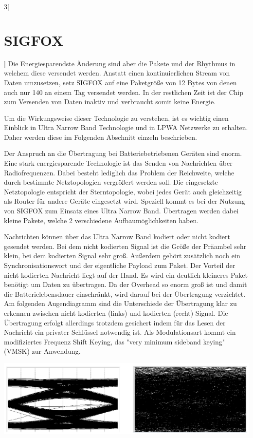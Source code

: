\begin{multicols}{3}[\section{SIGFOX}]
Die Energiesparendste Änderung sind aber die Pakete und der Rhythmus in welchem diese versendet werden. Anstatt einen kontinuierlichen Stream von Daten umzusetzen, setz SIGFOX auf eine Paketgröße von 12 Bytes von denen auch nur 140 an einem Tag versendet werden. In der restlichen Zeit ist der Chip zum Versenden von Daten inaktiv und verbraucht somit keine Energie.~\cite{sigfox.3}

Um die Wirkungsweise dieser Technologie zu verstehen, ist es wichtig einen Einblick in Ultra Narrow Band Technologie und in LPWA Netzwerke zu erhalten. Daher werden diese im Folgenden Abschnitt einzeln beschrieben.~\cite{sigfox.3}

Der Anspruch an die Übertragung bei Batteriebetriebenen Geräten sind enorm. Eine stark energiesparende Technologie ist das Senden von Nachrichten über Radiofrequenzen. Dabei besteht lediglich das Problem der Reichweite, welche durch bestimmte Netztopologien vergrößert werden soll. Die eingesetzte Netztopologie entspricht der Sterntopologie, wobei jedes Gerät auch gleichzeitig als Router für andere Geräte eingesetzt wird. Speziell kommt es bei der Nutzung von SIGFOX zum Einsatz eines Ultra Narrow Band. Übertragen werden dabei kleine Pakete, welche 2 verschiedene Aufbaumöglichkeiten haben.~\cite{sigfox.3}

Nachrichten können über das Ultra Narrow Band kodiert oder nicht kodiert gesendet werden. Bei dem nicht kodierten Signal ist die Größe der Präambel sehr klein, bei dem kodierten Signal sehr groß. Außerdem gehört zusätzlich noch ein Synchronisationswort und der eigentliche Payload zum Paket. Der Vorteil der nicht kodierten Nachricht liegt auf der Hand. Es wird ein deutlich kleineres Paket benötigt um Daten zu übertragen. Da der Overhead so enorm groß ist und damit die Batterielebensdauer einschränkt, wird darauf bei der Übertragung verzichtet. Am folgenden Augendiagramm sind die Unterschiede der Übertragung klar zu erkennen zwischen nicht kodierten (links) und kodierten (recht) Signal. Die Übertragung erfolgt allerdings trotzdem gesichert indem für das Lesen der Nachricht ein privater Schlüssel notwendig ist. Als Modulationsart kommt ein modifiziertes Frequenz Shift Keying, das "very minimum sideband keying" (VMSK) zur Anwendung.~\cite{sigfox.4}

\begin{Figure}
\includegraphics[width=\linewidth]{Kapitel/SIGFOX/Grafiken/sigfox_eyediagramm.png}
\end{Figure}


\end{multicols}
